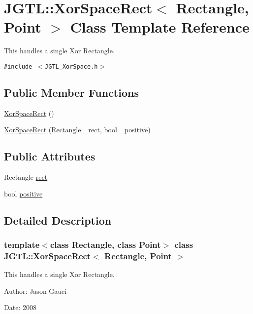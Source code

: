 \hypertarget{class_j_g_t_l_1_1_xor_space_rect}{
\section{JGTL::Xor\-Space\-Rect$<$ Rectangle, Point $>$ Class Template Reference}
\label{class_j_g_t_l_1_1_xor_space_rect}
}
This handles a single Xor Rectangle.  


{\tt \#include $<$JGTL\_\-Xor\-Space.h$>$}

\subsection*{Public Member Functions}
\begin{CompactItemize}
\item 
\hyperlink{class_j_g_t_l_1_1_xor_space_rect_aeeac5078979658fb7234c36c7faab90}{Xor\-Space\-Rect} ()
\item 
\hyperlink{class_j_g_t_l_1_1_xor_space_rect_7e23ca980e665ef6bea0e1f8052a2628}{Xor\-Space\-Rect} (Rectangle \_\-rect, bool \_\-positive)
\end{CompactItemize}
\subsection*{Public Attributes}
\begin{CompactItemize}
\item 
Rectangle \hyperlink{class_j_g_t_l_1_1_xor_space_rect_5cb60d58273133694cc1f0c821471603}{rect}
\item 
bool \hyperlink{class_j_g_t_l_1_1_xor_space_rect_20faa85ce2e1856b7a94a7613f7a6074}{positive}
\end{CompactItemize}


\subsection{Detailed Description}
\subsubsection*{template$<$class Rectangle, class Point$>$ class JGTL::Xor\-Space\-Rect$<$ Rectangle, Point $>$}

This handles a single Xor Rectangle. 

\begin{Desc}
\item[Author:]Jason Gauci \end{Desc}
\begin{Desc}
\item[Date:]2008 \end{Desc}




